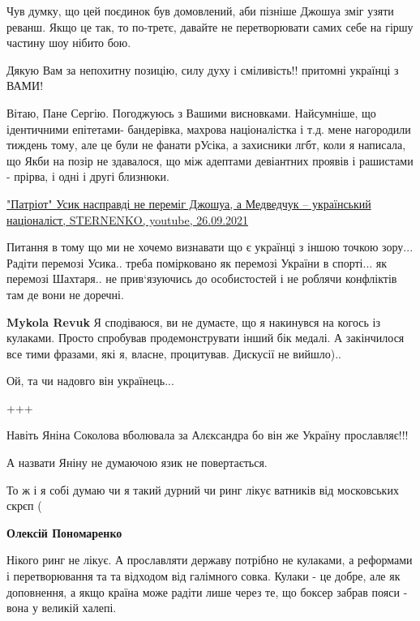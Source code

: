 \begin{itemize}
Чув думку, що цей поєдинок був домовлений, аби пізніше Джошуа зміг узяти
реванш. Якщо це так, то по-третє, давайте не перетворювати самих себе на гіршу
частину шоу нібито бою.


Дякую Вам за непохитну позицію, силу духу і сміливість!! притомні українці з ВАМИ!


Вітаю, Пане Сергію. Погоджуюсь з Вашими висновками. Найсумніше, що ідентичними
епітетами- бандерівка, махрова націоналістка і т.д. мене нагородили тиждень
тому, але це були не фанати рУсіка, а захисники лгбт, коли я написала, що
Якби на позір не здавалося, що між адептами девіантних проявів і рашистами -
прірва, і одні і другі близнюки.


\href{https://youtu.be/RB-zYEcJUm8}{%
"Патріот" Усик насправді не переміг Джошуа, а Медведчук – український націоналіст, %
STERNENKO, youtube, 26.09.2021%
}


Питання в тому що ми не хочемо визнавати що є українці з іншою точкою зору...
Радіти перемозі Усика.. треба помірковано як перемозі України в спорті... як
перемозі Шахтаря.. не прив‘язуючись до особистостей і не роблячи конфліктів там
де вони не доречні.

\begin{itemize} %
\textbf{Mykola Revuk} Я сподіваюся, ви не думаєте, що я накинувся на когось із кулаками. Просто спробував продемонструвати інший бік медалі. А закінчилося все тими фразами, які я, власне, процитував. Дискусії не вийшло)..
\end{itemize} %

Ой, та чи надовго він українець...

+++


Навіть Яніна Соколова вболювала за Алєксандра бо він же Україну прославляє!!!

А назвати Яніну не думаючою язик не повертається.

То ж і я собі думаю чи я такий дурний чи ринг лікує ватників від московських скрєп (

\begin{itemize} %
\textbf{Олексій Пономаренко} 

Нікого ринг не лікує. А прославляти державу потрібно не кулаками, а реформами і
перетворювання та та відходом від галімного совка. Кулаки - це добре, але як
доповнення, а якщо країна може радіти лише через те, що боксер забрав пояси -
вона у великій халепі.


\end{itemize}
\end{itemize}

